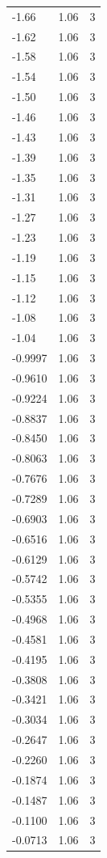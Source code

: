 \begin{longtable}{lrr}
  -1.66 & 1.06 & 3 \\
  -1.62 & 1.06 & 3 \\
  -1.58 & 1.06 & 3 \\
  -1.54 & 1.06 & 3 \\
  -1.50 & 1.06 & 3 \\
  -1.46 & 1.06 & 3 \\
  -1.43 & 1.06 & 3 \\
  -1.39 & 1.06 & 3 \\
  -1.35 & 1.06 & 3 \\
  -1.31 & 1.06 & 3 \\
  -1.27 & 1.06 & 3 \\
  -1.23 & 1.06 & 3 \\
  -1.19 & 1.06 & 3 \\
  -1.15 & 1.06 & 3 \\
  -1.12 & 1.06 & 3 \\
  -1.08 & 1.06 & 3 \\
  -1.04 & 1.06 & 3 \\
  -0.9997 & 1.06 & 3 \\
  -0.9610 & 1.06 & 3 \\
  -0.9224 & 1.06 & 3 \\
  -0.8837 & 1.06 & 3 \\
  -0.8450 & 1.06 & 3 \\
  -0.8063 & 1.06 & 3 \\
  -0.7676 & 1.06 & 3 \\
  -0.7289 & 1.06 & 3 \\
  -0.6903 & 1.06 & 3 \\
  -0.6516 & 1.06 & 3 \\
  -0.6129 & 1.06 & 3 \\
  -0.5742 & 1.06 & 3 \\
  -0.5355 & 1.06 & 3 \\
  -0.4968 & 1.06 & 3 \\
  -0.4581 & 1.06 & 3 \\
  -0.4195 & 1.06 & 3 \\
  -0.3808 & 1.06 & 3 \\
  -0.3421 & 1.06 & 3 \\
  -0.3034 & 1.06 & 3 \\
  -0.2647 & 1.06 & 3 \\
  -0.2260 & 1.06 & 3 \\
  -0.1874 & 1.06 & 3 \\
  -0.1487 & 1.06 & 3 \\
  -0.1100 & 1.06 & 3 \\
  -0.0713 & 1.06 & 3 \\

\end{longtable}
